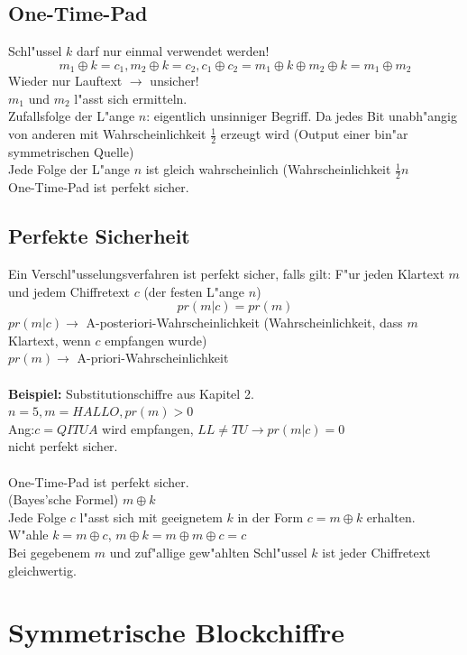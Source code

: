 \subsection{One-Time-Pad}
Schl"ussel $k$ darf nur einmal verwendet werden!\\
\[
	m_1\oplus k=c_1, m_2 \oplus k=c_2,c_1\oplus c_2=m_1\oplus k \oplus m_2\oplus k=m_1\oplus m_2
\]
Wieder nur Lauftext $\rightarrow$ unsicher!\\
$m_1$ und $m_2$ l"asst sich ermitteln.\\
Zufallsfolge der L"ange $n$: eigentlich unsinniger Begriff. Da jedes Bit unabh"angig von anderen mit Wahrscheinlichkeit $\frac{1}{2}$ erzeugt wird (Output einer bin"ar symmetrischen Quelle)\\
Jede Folge der L"ange $n$ ist gleich wahrscheinlich (Wahrscheinlichkeit $\frac{1}{2} n$\\
One-Time-Pad ist perfekt sicher.
\subsection{Perfekte Sicherheit}
Ein Verschl"usselungsverfahren ist perfekt sicher, falls gilt: F"ur jeden Klartext $m$ und jedem Chiffretext $c$ (der festen L"ange $n$)
\[
	pr(m|c)=pr(m)
\]
$pr(m|c)\rightarrow$ A-posteriori-Wahrscheinlichkeit (Wahrscheinlichkeit, dass $m$ Klartext, wenn $c$ empfangen wurde)\\
$pr(m)\rightarrow$ A-priori-Wahrscheinlichkeit\\
\\
\textbf{Beispiel:} Substitutionschiffre aus Kapitel 2.\\
$n=5, m=HALLO, pr(m)>0$\\
Ang:$c=QITUA$ wird empfangen, $LL\neq TU \rightarrow pr(m|c)=0$\\
nicht perfekt sicher.\\
\\
One-Time-Pad ist perfekt sicher. \\
(Bayes'sche Formel) $m\oplus k$\\
Jede Folge $c$ l"asst sich mit geeignetem $k$ in der Form $c=m\oplus k$ erhalten.\\
W"ahle $k=m\oplus c$, $m\oplus k=m\oplus m \oplus c=c$\\
Bei gegebenem $m$ und zuf"allige gew"ahlten Schl"ussel $k$ ist jeder Chiffretext gleichwertig.


\section{Symmetrische Blockchiffre}

